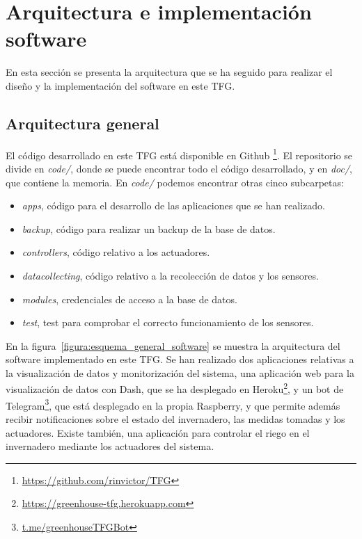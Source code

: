 \documentclass[a4paper, 12pt, oneside]{book}
\begin{document}

	
\section{Arquitectura e implementación software}
\label{sec:Arquitectura e implementación software}
En esta sección se presenta la arquitectura que se ha seguido para realizar el diseño y la implementación del software en este TFG.

\subsection{Arquitectura general}
\label{subsec:arquitectura general}
El código desarrollado en este TFG está disponible en Github \footnote{\url{https://github.com/rinvictor/TFG}}. El repositorio se divide en \textit{code/}, donde se puede encontrar todo el código desarrollado, y en \textit{doc/}, que contiene la memoria.
En \textit{code/} podemos encontrar otras cinco subcarpetas:
\begin{itemize}
\item \textit{apps}, código para el desarrollo de las aplicaciones que se han realizado.
\item \textit{backup}, código para realizar un backup de la base de datos.
\item \textit{controllers}, código relativo a los actuadores.
\item \textit{datacollecting}, código relativo a la recolección de datos y los sensores.
\item \textit{modules}, credenciales de acceso a la base de datos.
\item \textit{test}, test para comprobar el correcto funcionamiento de los sensores.
\end{itemize}

En la figura~\ref{figura:esquema_general_software} se muestra la arquitectura del software implementado en este TFG. Se han realizado dos aplicaciones relativas a la visualización de datos y monitorización del sistema, una aplicación web para la visualización de datos con Dash, que se ha desplegado en Heroku\footnote{\url{https://greenhouse-tfg.herokuapp.com}}, y un bot de Telegram\footnote{\url{t.me/greenhouseTFGBot}}, que está desplegado en la propia Raspberry, y que permite además recibir notificaciones sobre el estado del invernadero, las medidas tomadas y los actuadores.
Existe también, una aplicación para controlar el riego en el invernadero mediante los actuadores del sistema.
\end{document}
